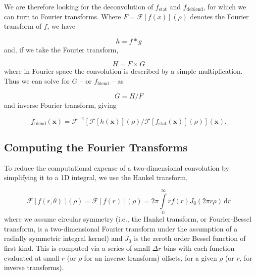 \documentclass[fleqn,usenatbib]{mnras}
\begin{document}
We are therefore looking for the deconvolution of $f_\mathrm{stat}$ and $f_\mathrm{deblend}$, for which we can turn to Fourier transforms. Where $F = \mathcal{F}[f(x)](\rho)$ denotes the Fourier transform of $f$, we have

\begin{equation}
	h = f * g
\end{equation}
and, if we take the Fourier transform,

\begin{equation}
H = F \times G
\end{equation}
where in Fourier space the convolution is described by a simple multiplication. Thus we can solve for $G$ -- or $f_\mathrm{blend}$ -- as

\begin{equation}
	G = H / F
\end{equation}
and inverse Fourier transform, giving

\begin{equation}
	f_\mathrm{blend}(\textbf{x}) = \mathcal{F}^{-1}\left[\mathcal{F}[h(\textbf{x})](\rho) / \mathcal{F}[f_\mathrm{stat}(\textbf{x})](\rho)\right](\textbf{x}).
\end{equation}

\subsection{Computing the Fourier Transforms}

To reduce the computational expense of a two-dimensional convolution by simplifying it to a 1D integral, we use the Hankel transform,

\begin{equation}
\mathcal{F}[f(r, \theta)](\rho) = \mathcal{F}[f(r)](\rho) = 2 \pi \int\limits_0^\infty\!r f(r) J_0(2 \pi r \rho)\,\mathrm{d}r
\end{equation}
where we assume circular symmetry (i.e., the Hankel transform, or Fourier-Bessel transform, is a two-dimensional Fourier transform under the assumption of a radially symmetric integral kernel) and $J_0$ is the zeroth order Bessel function of first kind. This is computed via a series of small $\Delta r$ bins with each function evaluated at small $r$ (or $\rho$ for an inverse transform) offsets, for a given $\rho$ (or $r$, for inverse transforms).
\end{document}
